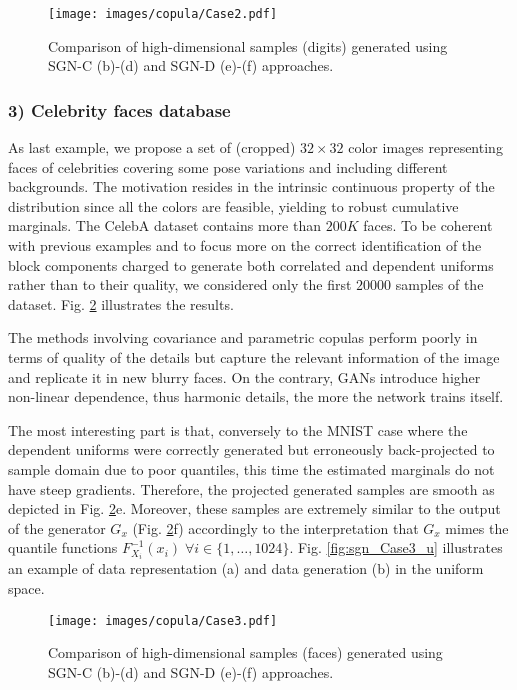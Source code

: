 \begin{figure}
\centering
\texttt{[image: images/copula/Case2.pdf]}
\caption{Comparison of high-dimensional samples (digits) generated using SGN-C (b)-(d) and SGN-D (e)-(f) approaches.}
\label{fig:sgn_Case2}
\end{figure}

\subsubsection{3) Celebrity faces database}
As last example, we propose a set of (cropped) $32\times 32$ color images representing faces of celebrities covering some pose variations and including different backgrounds. The motivation resides in the intrinsic continuous property of the distribution since all the colors are feasible, yielding to robust cumulative marginals. 
The CelebA dataset \cite{CelebA} contains more than $200K$ faces. To be coherent with previous examples and to focus more on the correct identification of the block components charged to generate both correlated and dependent uniforms rather than to their quality, we considered only the first $20000$ samples of the dataset.
Fig. \ref{fig:sgn_Case3} illustrates the results.

The methods involving covariance and parametric copulas perform poorly in terms of quality of the details but capture the relevant information of the image and replicate it in new blurry faces. On the contrary, GANs introduce higher non-linear dependence, thus harmonic details, the more the network trains itself. 

The most interesting part is that, conversely to the MNIST case where the dependent uniforms were correctly generated but erroneously back-projected to sample domain due to poor quantiles, this time the estimated marginals do not have steep gradients. Therefore, the projected generated samples are smooth as depicted in Fig. \ref{fig:sgn_Case3}e. Moreover, these samples are extremely similar to the output of the generator $G_x$ (Fig. \ref{fig:sgn_Case3}f) accordingly to the interpretation that $G_x$ mimes the quantile functions $F_{X_i}^{-1}(x_i)\; \forall i \in \{1,\dots,1024\}$. Fig. \ref{fig:sgn_Case3_u} illustrates an example of data representation (a) and data generation (b) in the uniform space.

\begin{figure}
\centering
\texttt{[image: images/copula/Case3.pdf]}
\caption{Comparison of high-dimensional samples (faces) generated using SGN-C (b)-(d) and SGN-D (e)-(f) approaches.}
\label{fig:sgn_Case3}
\end{figure}

